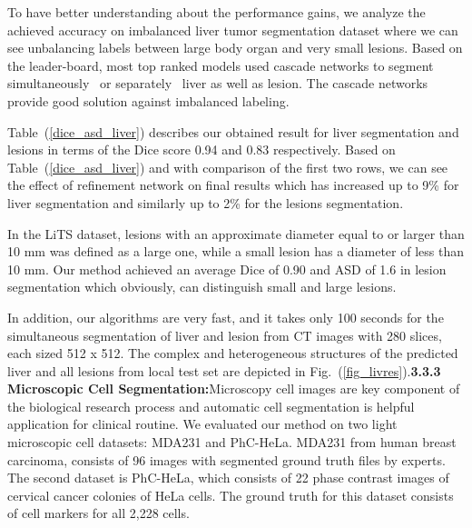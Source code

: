 \documentclass[10pt,twocolumn,letterpaper]{article}
\begin{document}
To have better understanding about the performance gains, we analyze the achieved accuracy on imbalanced liver tumor segmentation dataset where we can see unbalancing labels between large body organ and very small lesions.
Based on the leader-board, most top ranked models used cascade networks to segment simultaneously~\cite{Han17a} or separately~\cite{BiKKF17, VorontsovCTPK17} liver as well as lesion.
The cascade networks provide good solution against imbalanced labeling.

Table~(\ref{dice_asd_liver}) describes our obtained result for liver segmentation and lesions in terms of the Dice score 0.94 and 0.83 respectively.
Based on Table~(\ref{dice_asd_liver}) and with comparison of the first two rows, we can see the effect of refinement network on final results which has increased up to 9\% for liver segmentation and similarly up to 2\% for the lesions segmentation.

In the LiTS dataset, lesions with an approximate diameter equal to or larger than 10 mm was defined as a large one, while a small lesion has a diameter of less than 10 mm.
Our method achieved an average Dice of 0.90 and ASD of 1.6 in lesion segmentation which obviously, can distinguish small and large lesions. %

In addition, our algorithms are very fast, and it takes only 100 seconds for the simultaneous segmentation of liver and lesion from CT images with 280 slices, each sized 512 x 512.
The complex and heterogeneous structures of the predicted liver and all lesions from local test set are depicted in Fig.~(\ref{fig_livres}).\textbf{3.3.3 Microscopic Cell Segmentation:}Microscopy cell images are key component of the biological research process and automatic cell segmentation is helpful application for clinical routine. We evaluated our method on two light microscopic cell datasets: MDA231 and PhC-HeLa.
MDA231 from human breast carcinoma, consists of 96 images with segmented ground truth files by experts.
The second dataset is PhC-HeLa, which consists of 22 phase contrast images of cervical cancer colonies of HeLa cells. The ground truth for this dataset consists of cell markers for all 2,228 cells.
\end{document}
